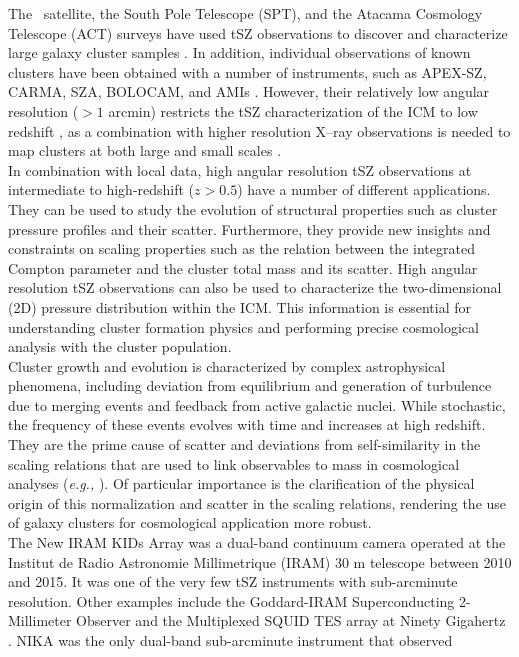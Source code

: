 \documentclass[traditabstract]{aa}
\begin{document}
The \planck\ satellite, the South Pole Telescope (SPT), and the Atacama Cosmology Telescope (ACT) surveys have used tSZ observations to discover and characterize large galaxy cluster samples \citep[\emph{e.g.,}][]{Planck_cata2,SPTcluster,ACT_cluster}. In addition, individual observations of known clusters have been obtained with a number of instruments, such as APEX-SZ, CARMA, SZA, BOLOCAM, and AMIs \citep[\emph{e.g.,}][]{Apexsz,Carmasz,SZA,Bolocamsz,AMI_followup}. However, their relatively low angular resolution ($> 1$ arcmin) restricts the tSZ characterization of the ICM to low redshift \citep{pla10, NonparamPressure,bon12,Planck_pressure_prof,SayersPointSource}, as a combination with higher resolution X--ray observations is needed to map clusters at both large and small scales \citep[\emph{e.g.,}][]{Planck_pressure_prof,eck13}.\\
In combination with local data, high angular resolution tSZ observations at intermediate to high-redshift ($z > 0.5$) have a number of different applications. They can be used to study the evolution of structural properties such as cluster pressure profiles and their scatter. Furthermore, they provide new insights and constraints on scaling properties such as the relation between the integrated Compton parameter and the cluster total mass and its scatter. High angular resolution tSZ observations can also be used to characterize the two-dimensional (2D) pressure distribution within the ICM. This information is essential for understanding cluster formation physics and performing precise cosmological analysis with the cluster population.\\
Cluster growth and evolution is characterized by complex astrophysical phenomena, including deviation from equilibrium and generation of turbulence due to merging events and feedback from active galactic nuclei. While stochastic, the frequency of these events evolves with time and increases at high redshift. They are the prime cause of scatter and deviations from self-similarity in the scaling relations that are used to link observables to mass in cosmological analyses (\emph{e.g.,} \citealt{mergers_bias,MUSIC_scaling}). Of particular importance is the clarification of the physical origin of this normalization and scatter in the scaling relations, rendering the use of galaxy clusters for cosmological application more robust.\\
The New IRAM KIDs Array \citep[NIKA;][]{NIKA_cam1,NIKA_elec2,cal13} was a dual-band continuum camera operated at the Institut de Radio Astronomie Millimetrique (IRAM) 30 m telescope between 2010 and 2015. It was one of the very few tSZ instruments with sub-arcminute resolution. Other examples include the Goddard-IRAM Superconducting 2-Millimeter Observer \citep[GISMO;][]{sta08} and the Multiplexed SQUID TES array at Ninety Gigahertz \citep[MUSTANG;][]{kor11}.  NIKA was the only dual-band sub-arcminute instrument \citep{NIKA_calib} that observed
\end{document}

